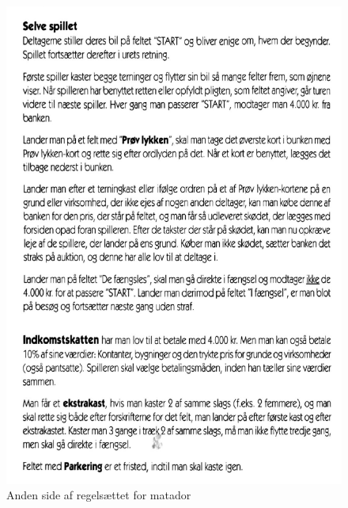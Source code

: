 \begin{flushleft}
\begin{figure}[H]
    \includegraphics[width=14cm]{Report/figures/MatadorRegler2.PNG}
    \caption{Anden side af regelsættet for matador}
    \label{MatadorRules2}
\end{figure}
\begin{figure}[H] %
    \centering

\end{figure}
\end{flushleft}
